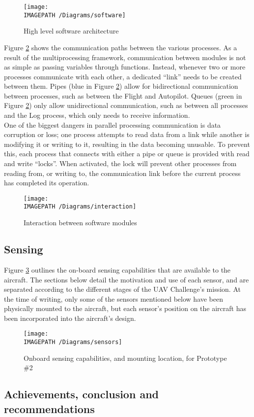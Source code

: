\begin{figure}[!ht]
	\centering
	\texttt{[image: \\IMAGEPATH /Diagrams/software]}
	\caption{High level software architecture}
	\label{fig:softwarearchitecture-exec}
\end{figure}

Figure \ref{fig:softwareinteraction-exec} shows the communication paths between the various processes. As a result of the multiprocessing framework, communication between modules is not as simple as passing variables through functions. Instead, whenever two or more processes communicate with each other, a dedicated ``link'' needs to be created between them. Pipes (blue in Figure \ref{fig:softwareinteraction-exec}) allow for bidirectional communication between processes, such as between the Flight and Autopilot. Queues (green in Figure \ref{fig:softwareinteraction-exec}) only allow unidirectional communication, such as between all processes and the Log process, which only needs to receive information.\\

One of the biggest dangers in parallel processing communication is data corruption or loss; one process attempts to read data from a link while another is modifying it or writing to it, resulting in the data becoming unusable. To prevent this, each process that connects with either a pipe or queue is provided with read and write ``locks''. When activated, the lock will prevent other processes from reading from, or writing to, the communication link before the current process has completed its operation.

\begin{figure}[H]
	\centering
	\texttt{[image: \\IMAGEPATH /Diagrams/interaction]}
	\caption{Interaction between software modules}
	\label{fig:softwareinteraction-exec}
\end{figure}

\subsection{Sensing}

Figure \ref{fig:sensing-exec} outlines the on-board sensing capabilities that are available to the aircraft. The sections below detail the motivation and use of each sensor, and are separated according to the different stages of the UAV Challenge's mission. At the time of writing, only some of the sensors mentioned below have been physically mounted to the aircraft, but each sensor's position on the aircraft has been incorporated into the aircraft's design.

\begin{figure}[!ht]
	\centering
	\texttt{[image: \\IMAGEPATH /Diagrams/sensors]}
	\caption{Onboard sensing capabilities, and mounting location, for Prototype \#2}
	\label{fig:sensing-exec}
\end{figure}


\subsection{Achievements, conclusion and recommendations}
